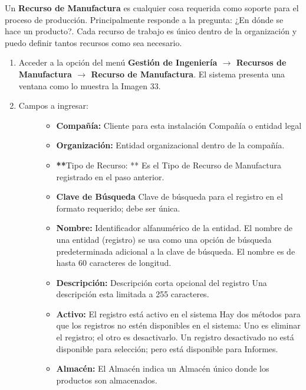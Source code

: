\documentclass[letterpaper,10pt,spanish]{sphinxmanual}
\begin{document}
Un \textbf{Recurso de Manufactura} es cualquier cosa requerida como soporte para el proceso de producción. Principalmente responde a la pregunta: ¿En dónde se hace un producto?. Cada recurso de trabajo es único dentro de la organización y puedo definir tantos recursos como sea necesario.
\begin{enumerate}
\item {} 
Acceder a la opción del menú \textbf{Gestión de Ingeniería \(\rightarrow\)  Recursos de Manufactura \(\rightarrow\) Recurso de Manufactura}. El sistema presenta una ventana como lo muestra la Imagen 33.

\item {} \begin{description}
\item[{Campos a ingresar:}] \leavevmode\begin{itemize}
\item {} 
\textbf{Compañía:} Cliente para esta instalación Compañía o entidad legal

\item {} 
\textbf{Organización:} Entidad organizacional dentro de la compañía.

\item {} 
{\color{red}\bfseries{}**}Tipo de Recurso: ** Es el Tipo de Recurso de Manufactura registrado en el paso anterior.

\item {} 
\textbf{Clave de Búsqueda} Clave de búsqueda para el registro en el formato requerido; debe ser única.

\item {} 
\textbf{Nombre:} Identificador alfanumérico de la entidad. El nombre de una entidad (registro) se usa como una opción de búsqueda predeterminada adicional a la clave de búsqueda. El nombre es de hasta 60 caracteres de longitud.

\item {} 
\textbf{Descripción:} Descripción corta opcional del registro Una descripción esta limitada a 255 caracteres.

\item {} 
\textbf{Activo:} El registro está activo en el sistema Hay dos métodos para que los registros no estén disponibles en el sistema: Uno es eliminar el registro; el otro es desactivarlo. Un registro desactivado no está disponible para selección; pero está disponible para Informes.

\item {} 
\textbf{Almacén:} El Almacén indica un Almacén único donde los productos son almacenados.


\end{itemize}
\end{description}
\end{enumerate}
\end{document}
